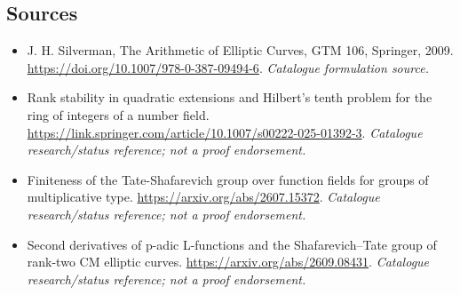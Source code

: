\documentclass[11pt,a4paper]{article}
\numberwithin{equation}{section}
\begin{document}
\subsection{Sources}
\begin{itemize}\raggedright
\item[\textnormal{[S1]}]\hypertarget{source:statement:1}{} J. H. Silverman, The Arithmetic of Elliptic Curves, GTM 106, Springer, 2009.
\url{https://doi.org/10.1007/978-0-387-09494-6}.
{\small\textit{Catalogue formulation source.}}
\item[\textnormal{[S2]}]\hypertarget{source:statement:2}{} Rank stability in quadratic extensions and Hilbert’s tenth problem for the ring of integers of a number field.
\url{https://link.springer.com/article/10.1007/s00222-025-01392-3}.
{\small\textit{Catalogue research/status reference; not a proof endorsement.}}
\item[\textnormal{[S3]}]\hypertarget{source:statement:3}{} Finiteness of the Tate-Shafarevich group over function fields for groups of multiplicative type.
\url{https://arxiv.org/abs/2607.15372}.
{\small\textit{Catalogue research/status reference; not a proof endorsement.}}
\item[\textnormal{[S4]}]\hypertarget{source:statement:4}{} Second derivatives of p-adic L-functions and the Shafarevich–Tate group of rank-two CM elliptic curves.
\url{https://arxiv.org/abs/2609.08431}.
{\small\textit{Catalogue research/status reference; not a proof endorsement.}}


\end{itemize}
\end{document}
